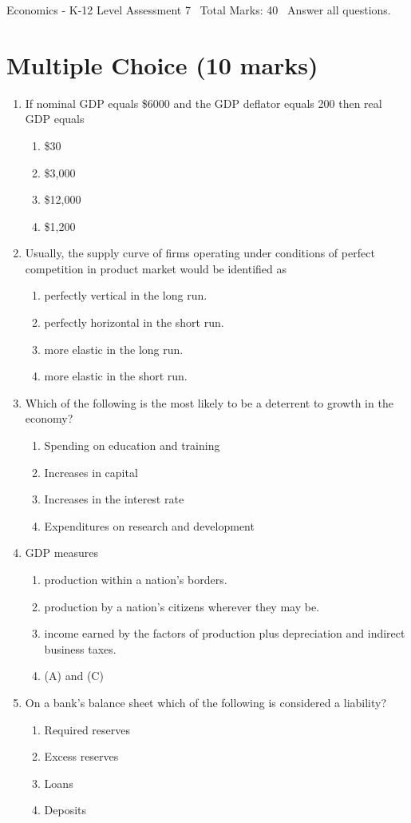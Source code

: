 \documentclass[12pt]{article}
\begin{document}
\begin{center}
Economics - K-12 Level Assessment 7 \
Total Marks: 40 \
Answer all questions.
\end{center}

\section*{Multiple Choice (10 marks)}
\begin{enumerate}[label=\arabic*.]
\item If nominal GDP equals \$6000 and the GDP deflator equals 200 then real GDP equals
\begin{enumerate}[label=(\alph*)]
    \item \$30
    \item \$3,000
    \item \$12,000
    \item \$1,200
\end{enumerate}
\item Usually, the supply curve of firms operating under conditions of perfect competition in product market would be identified as
\begin{enumerate}[label=(\alph*)]
    \item perfectly vertical in the long run.
    \item perfectly horizontal in the short run.
    \item more elastic in the long run.
    \item more elastic in the short run.
\end{enumerate}
\item Which of the following is the most likely to be a deterrent to growth in the economy?
\begin{enumerate}[label=(\alph*)]
    \item Spending on education and training
    \item Increases in capital
    \item Increases in the interest rate
    \item Expenditures on research and development
\end{enumerate}
\item GDP measures
\begin{enumerate}[label=(\alph*)]
    \item production within a nation's borders.
    \item production by a nation's citizens wherever they may be.
    \item income earned by the factors of production plus depreciation and indirect business taxes.
    \item (A) and (C)
\end{enumerate}
\item On a bank's balance sheet which of the following is considered a liability?
\begin{enumerate}[label=(\alph*)]
    \item Required reserves
    \item Excess reserves
    \item Loans
    \item Deposits
\end{enumerate}
\end{enumerate}
\end{document}

